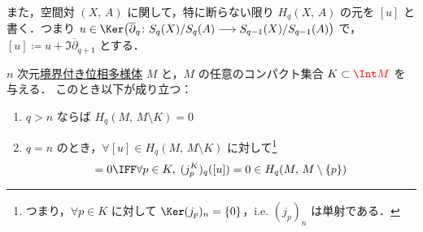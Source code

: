 \documentclass[algtopo_main]{subfiles}
\begin{document}
また，空間対 $(X,\, A)$ に関して，特に断らない限り $H_q (X,\, A)$ の元を $[u]$ と書く．つまり $u \in \Ker \bigl(\overline{\partial}_{q} \colon S_{q}(X) / S_{q}(A) \lto S_{q-1}(X) / S_{q-1}(A)\bigr)$ で，$[u] \coloneqq u + \Im \overline{\partial}_{q+1}$ とする．
\begin{mylem}[label=lem:fundamental-class-1]{}
    $n$ 次元\hyperref[def:mani-with-boundary]{境界付き位相多様体} $M$ と，$M$ の任意のコンパクト集合 $K \subset \textcolor{red}{\Int M}$ を与える．
    このとき以下が成り立つ：
    \begin{enumerate}
        \item $q > n$ ならば $H_q(M,\, M \setminus K) = 0$
        \item $q=n$ のとき，$\forall [u] \in H_q(M,\, M \setminus K)$ に対して\footnote{つまり，$\forall p \in K$ に対して $\Ker (j_p)_n = \{0\}$，i.e. $(j_p)_n$ は単射である．}
        \begin{align}
            [u] = 0 \IFF \forall p \in K,\; (j^K_{p})_q ([u]) = 0 \in H_q (M,\, M \setminus \{p\})
        \end{align}
    \end{enumerate}
\end{mylem}
\end{document}
